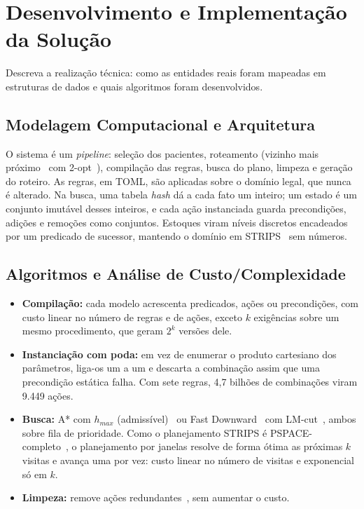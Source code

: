 \documentclass[11pt,a4paper]{article}
\begin{document}
\section{Desenvolvimento e Implementação da Solução}

\begin{instrucao}
Descreva a realização técnica: como as entidades reais foram mapeadas em estruturas de dados e quais algoritmos foram desenvolvidos.
\end{instrucao}

\subsection{Modelagem Computacional e Arquitetura}
O sistema é um \textit{pipeline}: seleção dos pacientes, roteamento (vizinho mais próximo~\cite{rosenkrantz} com 2-opt~\cite{croes}), compilação das regras, busca do plano, limpeza e geração do roteiro. As regras, em TOML, são aplicadas sobre o domínio legal, que nunca é alterado. Na busca, uma tabela \textit{hash} dá a cada fato um inteiro; um estado é um conjunto imutável desses inteiros, e cada ação instanciada guarda precondições, adições e remoções como conjuntos. Estoques viram níveis discretos encadeados por um predicado de sucessor, mantendo o domínio em STRIPS~\cite{fikes} sem números.

\subsection{Algoritmos e Análise de Custo/Complexidade}
\begin{itemize}
    \item \textbf{Compilação:} cada modelo acrescenta predicados, ações ou precondições, com custo linear no número de regras e de ações, exceto $k$ exigências sobre um mesmo procedimento, que geram $2^k$ versões dele.
    \item \textbf{Instanciação com poda:} em vez de enumerar o produto cartesiano dos parâmetros, liga-os um a um e descarta a combinação assim que uma precondição estática falha. Com sete regras, 4,7 bilhões de combinações viram 9.449 ações.
    \item \textbf{Busca:} A* com $h_{max}$ (admissível)~\cite{bonet} ou Fast Downward~\cite{helmert2006} com LM-cut~\cite{lmcut}, ambos sobre fila de prioridade. Como o planejamento STRIPS é PSPACE-completo~\cite{bylander}, o planejamento por janelas resolve de forma ótima as próximas $k$ visitas e avança uma por vez: custo linear no número de visitas e exponencial só em $k$.
    \item \textbf{Limpeza:} remove ações redundantes~\cite{nakhost}, sem aumentar o custo.
\end{itemize}
\end{document}
